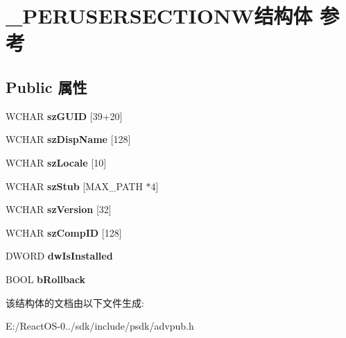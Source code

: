 \hypertarget{struct___p_e_r_u_s_e_r_s_e_c_t_i_o_n_w}{}\section{\+\_\+\+P\+E\+R\+U\+S\+E\+R\+S\+E\+C\+T\+I\+O\+N\+W结构体 参考}
\label{struct___p_e_r_u_s_e_r_s_e_c_t_i_o_n_w}
\subsection*{Public 属性}
\begin{DoxyCompactItemize}
\item 
\mbox{\label{struct___p_e_r_u_s_e_r_s_e_c_t_i_o_n_w_ab149031a32c03611c248376bbaf94c06}} 
W\+C\+H\+AR {\bfseries sz\+G\+U\+ID} \mbox{[}39+20\mbox{]}
\item 
\mbox{\label{struct___p_e_r_u_s_e_r_s_e_c_t_i_o_n_w_add19eec931105909432ed913cbb0f50e}} 
W\+C\+H\+AR {\bfseries sz\+Disp\+Name} \mbox{[}128\mbox{]}
\item 
\mbox{\label{struct___p_e_r_u_s_e_r_s_e_c_t_i_o_n_w_a6983c2b0865b8898895ce5e86bee9533}} 
W\+C\+H\+AR {\bfseries sz\+Locale} \mbox{[}10\mbox{]}
\item 
\mbox{\label{struct___p_e_r_u_s_e_r_s_e_c_t_i_o_n_w_a39f425101c0bbe28766990f921499587}} 
W\+C\+H\+AR {\bfseries sz\+Stub} \mbox{[}M\+A\+X\+\_\+\+P\+A\+TH $\ast$4\mbox{]}
\item 
\mbox{\label{struct___p_e_r_u_s_e_r_s_e_c_t_i_o_n_w_ad4bd04f289889709906efd6991d3c933}} 
W\+C\+H\+AR {\bfseries sz\+Version} \mbox{[}32\mbox{]}
\item 
\mbox{\label{struct___p_e_r_u_s_e_r_s_e_c_t_i_o_n_w_af8b2b24e97983d9f554ef71fc165d8a7}} 
W\+C\+H\+AR {\bfseries sz\+Comp\+ID} \mbox{[}128\mbox{]}
\item 
\mbox{\label{struct___p_e_r_u_s_e_r_s_e_c_t_i_o_n_w_a535e49b7c14c930ab72c31f4984d1df3}} 
D\+W\+O\+RD {\bfseries dw\+Is\+Installed}
\item 
\mbox{\label{struct___p_e_r_u_s_e_r_s_e_c_t_i_o_n_w_a3f3036d19c8c1445509896022d0a7697}} 
B\+O\+OL {\bfseries b\+Rollback}
\end{DoxyCompactItemize}


该结构体的文档由以下文件生成\+:\begin{DoxyCompactItemize}
\item 
E\+:/\+React\+O\+S-\/0../sdk/include/psdk/advpub.\+h\end{DoxyCompactItemize}
